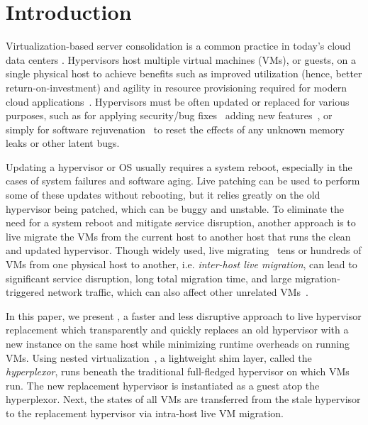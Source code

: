 \section{Introduction}
Virtualization-based server consolidation is a common practice in  today's cloud data 
centers \cite{ec2, azure, gcp}. Hypervisors host multiple
virtual machines (VMs), or guests, on a  single physical host to achieve benefits such as 
improved utilization  (hence, better return-on-investment) and agility in 
resource provisioning required for modern cloud applications~\cite{gcp_auto,heap_auto,azure_auto,gcp_serverless, lambdamodel}. 
Hypervisors must be often updated or replaced for various 
purposes, such as for applying security/bug fixes~\cite{xenpatch,kvmbugs}
adding new features~\cite{brasser2014swap, gcpsecurity},
or simply for software rejuvenation~\cite{le2011rehype}
to reset the effects of any unknown memory leaks or other latent bugs.

Updating a hypervisor or OS usually requires a system reboot, especially in 
the cases of system failures and software aging. 
Live patching \cite{Livepatch:Xen} can be used to perform
some of these updates without rebooting, but it relies greatly on 
the old hypervisor being patched, which can be buggy and unstable.
To eliminate the need for a system reboot and 
mitigate service disruption, another approach is to live migrate the VMs from the current host to another host that 
runs the clean and updated hypervisor.
Though widely used, live migrating~\cite{clark2005live, postcopy} tens or hundreds of 
VMs from one physical host to another, i.e. {\em inter-host live migration}, 
can lead to significant service disruption, long
total migration time, and large migration-triggered network traffic, which can
also affect other unrelated VMs~\cite{mann2012remedy}.

In this paper, we present {\bf \arch}, a faster and less disruptive
approach to live hypervisor replacement which transparently
and quickly replaces an old hypervisor with a new instance on the same host
while minimizing runtime overheads on running VMs.
Using nested virtualization~\cite{turtles}, a lightweight shim layer, called 
the {\em hyperplexor}, runs beneath the traditional full-fledged hypervisor on which VMs run.
The new replacement hypervisor is instantiated as a guest atop the hyperplexor.
Next, the states of all VMs are transferred from the stale hypervisor to the
replacement hypervisor via intra-host live VM migration. 

